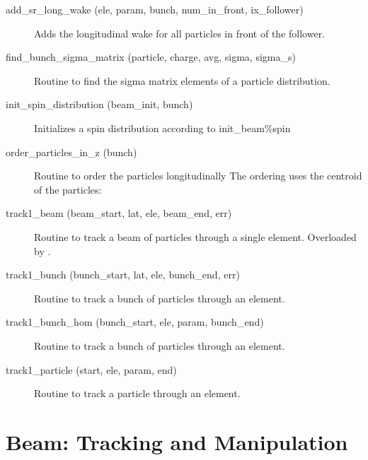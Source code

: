 \begin{description}

\label{r:add.sr.long.wake}
\item[add_sr_long_wake (ele, param, bunch, num_in_front, ix_follower)] \Newline 
Adds the longitudinal wake for all particles in front of the follower.

\label{r:find.bunch.sigma.matrix}
\item[find_bunch_sigma_matrix (particle, charge, avg, sigma, sigma_s)] \Newline 
Routine to find the sigma matrix elements of a particle distribution.

\label{r:init.spin.distribution}
\item[init_spin_distribution (beam_init, bunch)] \Newline 
Initializes a spin distribution according to init_beam\%spin

\label{r:order.particles.in.z}
\item[order_particles_in_z (bunch)] \Newline 
Routine to order the particles longitudinally 
The ordering uses the centroid of the particles:

\label{r:track1.beam}
\item[track1_beam (beam_start, lat, ele, beam_end, err)] \Newline 
Routine to track a beam of particles through a single element.
Overloaded by .

\label{r:track1.bunch}
\item[track1_bunch (bunch_start, lat, ele, bunch_end, err)] \Newline 
Routine to track a bunch of particles through an element.

\label{r:track1.bunch.hom}
\item[track1_bunch_hom (bunch_start, ele, param, bunch_end)] \Newline 
Routine to track a bunch of particles through an element.

\label{r:track1.particle}
\item[track1_particle (start, ele, param, end)] \Newline 
Routine to track a particle through an element.

\end{description}

\section{Beam: Tracking and Manipulation}
\label{r:beam}    

